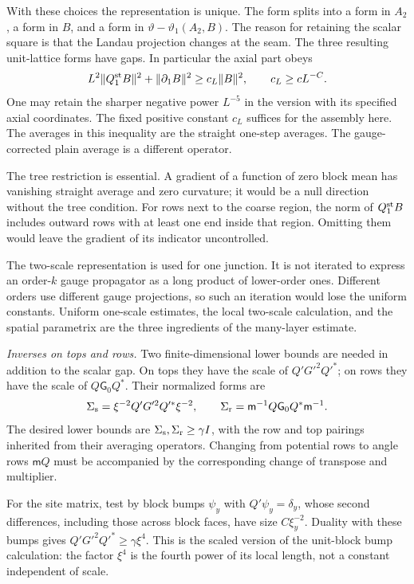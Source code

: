 \documentclass[11pt,letterpaper,reqno]{amsart}
\theoremstyle{definition}
\theoremstyle{remark}
\begin{document}
With these choices the representation is unique. The form
splits into a form in $A_2$, a form in $B$, and a form in
$\vartheta-\vartheta_1(A_2,B)$. The reason for retaining
the scalar square is that the Landau projection changes at
the seam. The three resulting unit-lattice forms have gaps.
In particular the axial part obeys
\[
 L^2\|Q_1^{\rm st}B\|^2+\|\partial_1B\|^2
                         \ge c_L\|B\|^2,
 \qquad c_L\ge cL^{-C}.
\]
One may retain the sharper negative power $L^{-5}$ in the
version with its specified axial coordinates. The fixed
positive constant $c_L$ suffices for the assembly here.
The averages in this inequality are the straight one-step
averages. The gauge-corrected plain average is a different
operator.

The tree restriction is essential. A gradient of a function
of zero block mean has vanishing straight average and zero
curvature; it would be a null direction without the tree
condition. For rows next to the coarse region, the norm of
$Q_1^{\rm st}B$ includes outward rows with at least one end
inside that region. Omitting them would leave the gradient
of its indicator uncontrolled.

The two-scale representation is used for one junction. It is
not iterated to express an order-$k$ gauge propagator as a
long product of lower-order ones. Different orders use
different gauge projections, so such an iteration would lose
the uniform constants. Uniform one-scale estimates, the local
two-scale calculation, and the spatial parametrix are the
three ingredients of the many-layer estimate.

\emph{Inverses on tops and rows.}
Two finite-dimensional lower bounds are needed in addition
to the scalar gap. On tops they have the scale of
$Q'G'^2Q'^*$; on rows they have the scale of
$Q\mathsf G_0Q^*$. Their normalized forms are
\[
 \Sigma_{\rm s}=\xi^{-2}Q'G'^2Q'^*\xi^{-2},\qquad
 \Sigma_{\rm r}=\mathsf m^{-1}Q\mathsf G_0Q^*\mathsf m^{-1}.
\]
The desired lower bounds are $\Sigma_{\rm s},\Sigma_{\rm r}
\ge\gamma I$, with the row and top pairings inherited from
their averaging operators. Changing from potential rows to
angle rows $\mathsf mQ$ must be accompanied by the
corresponding change of transpose and multiplier.

For the site matrix, test by block bumps $\psi_y$ with
$Q'\psi_y=\delta_y$, whose second differences, including
those across block faces, have size $C\xi_y^{-2}$.
Duality with these bumps gives
$Q'G'^2Q'^*\ge\gamma\xi^4$. This is the scaled version
of the unit-block bump calculation: the factor $\xi^4$
is the fourth power of its local length, not a constant
independent of scale.
\end{document}

